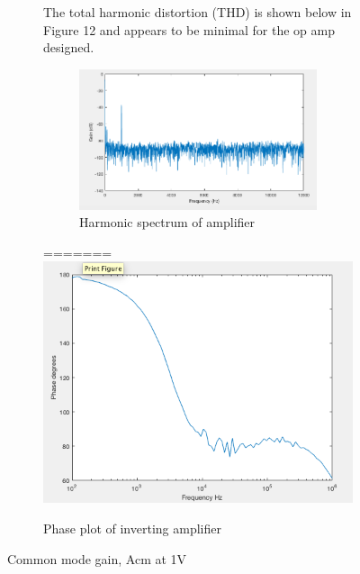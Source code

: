 \begin{figure}[H]
\begin{subfigure}[b]{0.45\textwidth}
The total harmonic distortion (THD) is shown below in Figure 12 and appears to be minimal for the op amp designed.

		\begin{figure}[H]
	\begin{center}
		\includegraphics[scale=.40]{ExperimentalImplementation/spectrum.png}
		\caption{Harmonic spectrum of amplifier}
		\label{fig:spectrum}
	\end{center}
\end{figure}
=======
		\includegraphics[scale=.40]{ExperimentalImplementation/invertingphase.png}
\caption{Phase plot of inverting amplifier}
\label{fig:invertingphase}
		\end{subfigure}
		\caption{Common mode gain, Acm at 1V}
		\label{fig:invertinggain}
	\end{figure} 




